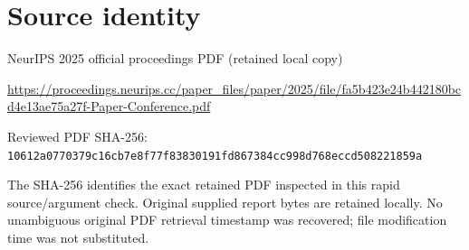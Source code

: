 \documentclass[11pt]{article}
\begin{document}
\section*{Source identity}

NeurIPS 2025 official proceedings PDF (retained local copy)

\url{https://proceedings.neurips.cc/paper_files/paper/2025/file/fa5b423e24b442180bcd4e13ae75a27f-Paper-Conference.pdf}

Reviewed PDF SHA-256: \nolinkurl{10612a0770379c16cb7e8f77f83830191fd867384cc998d768eccd508221859a}

The SHA-256 identifies the exact retained PDF inspected in this rapid source/argument check. Original supplied report bytes are retained locally. No unambiguous original PDF retrieval timestamp was recovered; file modification time was not substituted.
\end{document}

